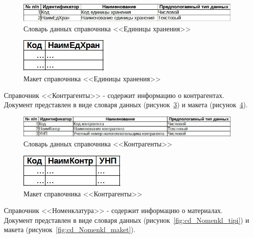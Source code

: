 \documentclass[12pt, a4paper, simple]{eskdtext}
\begin{document}
    \begin{figure}[p!]
        \centering
        \includegraphics[]
            {_docs/СД_ЕдХран_типы.jpg}
        \caption{Словарь данных справочника <<Единицы хранения>>}
        \label{fig:cd_EdXran_tipi}
    \end{figure}

    \begin{figure}[p!]
        \centering
        \includegraphics[]
            {_docs/СД_ЕдХран_макет.jpg}
        \caption{Макет справочника <<Единицы хранения>>}
        \label{fig:cd_EdXran_maket}
    \end{figure}

    Справочник <<Контрагенты>> - содержит информацию о контрагентах.
    Документ представлен в виде словаря данных (рисунок~\ref{fig:cd_Kontrag_tipi})
    и макета (рисунок~\ref{fig:cd_Kontrag_maket}).

    \begin{figure}[p!]
        \centering
        \includegraphics[width=16cm]
            {_docs/СД_Контраг_типы.jpg}
        \caption{Словарь данных справочника <<Контрагенты>>}
        \label{fig:cd_Kontrag_tipi}
    \end{figure}

    \begin{figure}[p!]
        \centering
        \includegraphics[]
            {_docs/СД_Контраг_макет.jpg}
        \caption{Макет справочника <<Контрагенты>>}
        \label{fig:cd_Kontrag_maket}
    \end{figure}

    Справочник <<Номенклатура>> - содержит информацию о материалах.
    Документ представлен в виде словаря данных (рисунок~\ref{fig:cd_Nomenkl_tipi})
    и макета (рисунок~\ref{fig:cd_Nomenkl_maket}).
\end{document}
